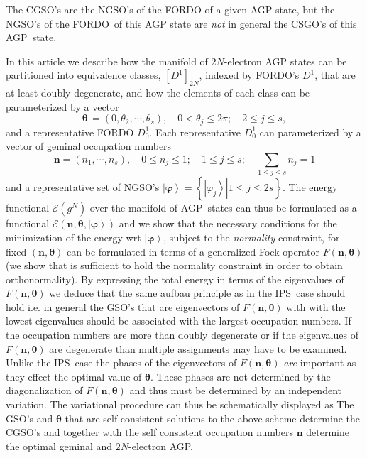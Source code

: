 \documentclass[aps,preprint]{revtex4}%
\begin{document}
The CGSO's are the NGSO's of the FORDO of a given AGP state, but the NGSO's of
the FORDO\ of this AGP state are \emph{not }in general the CSGO's of this AGP\ state.

In this article we describe how the manifold of $2N$-electron AGP states can
be partitioned into equivalence classes, $\left[  D^{1}\right]  _{2N}$,
indexed by FORDO's $D^{1}$, that are at least doubly degenerate, and how the
elements of each class can be parameterized by a vector
\begin{equation}
\mathbf{\theta\,}=\left(  0,\theta_{2},\cdots,\theta_{s}\right)
,\quad0<\theta_{j}\leq2\pi;\quad2\leq j\leq s,
\end{equation}
and a representative FORDO $D_{0}^{1}.$ Each representative $D_{0}^{1}$ can
parameterized by a vector of geminal occupation numbers%
\begin{equation}
\mathbf{n}=\left(  n_{1},\cdots,n_{s}\right)  ,\quad0\leq n_{j}\leq
1;\quad1\leq j\leq s;\quad%
{\textstyle\sum\limits_{1\leq j\leq s}}
n_{j}=1
\end{equation}
and a representative set of NGSO's $\left\vert \mathbf{\varphi}\right\rangle
=\left\{  \left.  \left\vert \varphi_{j}\right\rangle \right\vert 1\leq
j\leq2s\right\}  $. The energy functional $\mathcal{E}\left(  g^{N}\right)  $
over the manifold of AGP\ states can thus be formulated as a functional
$\mathcal{E}\left(  \mathbf{n},\mathbf{\theta,}\left\vert \mathbf{\varphi
}\right\rangle \right)  $ and we show that the necessary conditions for the
minimization of the energy wrt $\left\vert \mathbf{\varphi}\right\rangle $,
subject to the \emph{normality} constraint, for fixed $\left(  \mathbf{n}%
,\mathbf{\theta}\right)  $ can be formulated in terms of a generalized Fock
operator $F\left(  \mathbf{n},\mathbf{\theta}\right)  $ (we show that is
sufficient to hold the normality constraint in order to obtain
orthonormality). By expressing the total energy in terms of the eigenvalues of
$F\left(  \mathbf{n},\mathbf{\theta}\right)  $ we deduce that the same aufbau
principle as in the IPS\ case should hold i.e. in general the GSO's that are
eigenvectors of $F\left(  \mathbf{n},\mathbf{\theta}\right)  $ with with the
lowest eigenvalues should be associated with the largest occupation numbers.
If the occupation numbers are more than doubly degenerate or if the
eigenvalues of $F\left(  \mathbf{n},\mathbf{\theta}\right)  $ are degenerate
than multiple assignments may have to be examined. Unlike the IPS\ case the
phases of the eigenvectors of $F\left(  \mathbf{n},\mathbf{\theta}\right)  $
\emph{are }important as they effect the optimal value of $\mathbf{\theta}$.
These phases are not determined by the diagonalization of $F\left(
\mathbf{n},\mathbf{\theta}\right)  $ and thus must be determined by an
independent variation. The variational procedure can thus be schematically
displayed as The GSO's and $\mathbf{\theta}$ that are self consistent
solutions to the above scheme determine the CGSO's and together with the self
consistent occupation numbers $\mathbf{n}$ determine the optimal geminal and
$2N$-electron AGP.
\end{document}
